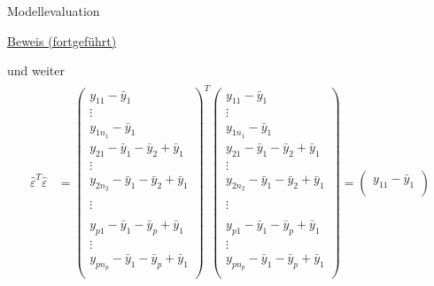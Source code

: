 \documentclass[
  8pt,
  ignorenonframetext,
]{beamer}
\begin{document}
\begin{frame}{Modellevaluation}
\protect\hypertarget{modellevaluation-9}{}
\footnotesize

\underline{Beweis (fortgeführt)}

und weiter \tiny \begin{align*}
\begin{split}
\hat{\varepsilon}^T\hat{\varepsilon}
& =
\begin{pmatrix}
y_{11}   - \bar{y}_1                            \\
\vdots                                          \\
y_{1n_1} - \bar{y}_1                            \\
y_{21}   - \bar{y}_1 - \bar{y}_2 + \bar{y}_1    \\
\vdots          \\
y_{2n_2} - \bar{y}_1 - \bar{y}_2 + \bar{y}_1    \\
                \\
\vdots          \\
                \\
y_{p1}   - \bar{y}_1 - \bar{y}_p + \bar{y}_1    \\
\vdots          \\
y_{pn_p}  - \bar{y}_1 - \bar{y}_p + \bar{y}_1   \\
\end{pmatrix}^T
\begin{pmatrix}
y_{11}   - \bar{y}_1                            \\
\vdots                                          \\
y_{1n_1} - \bar{y}_1                            \\
y_{21}   - \bar{y}_1 - \bar{y}_2 + \bar{y}_1    \\
\vdots          \\
y_{2n_2} - \bar{y}_1 - \bar{y}_2 + \bar{y}_1    \\
                \\
\vdots          \\
                \\
y_{p1}   - \bar{y}_1 - \bar{y}_p + \bar{y}_1    \\
\vdots          \\
y_{pn_p}  - \bar{y}_1 - \bar{y}_p + \bar{y}_1   \\
\end{pmatrix}
=
\begin{pmatrix}
y_{11}   - \bar{y}_1    \\

\end{pmatrix}
\end{split}
\end{align*}
\end{frame}
\end{document}
